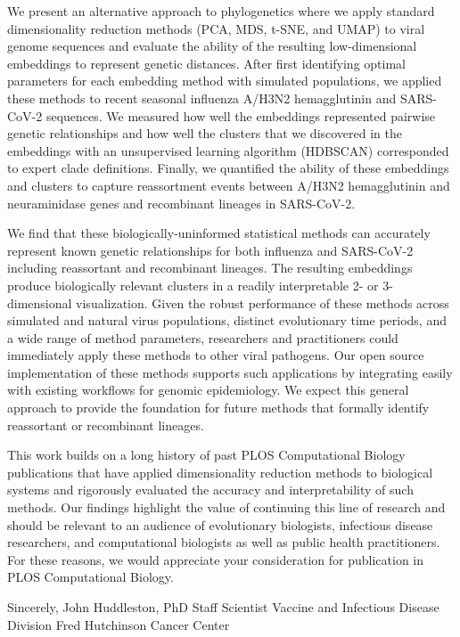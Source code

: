 \documentclass[11pt]{article}
\begin{document}
We present an alternative approach to phylogenetics where we apply standard dimensionality reduction methods (PCA, MDS, t-SNE, and UMAP) to viral genome sequences and evaluate the ability of the resulting low-dimensional embeddings to represent genetic distances.
After first identifying optimal parameters for each embedding method with simulated populations, we applied these methods to recent seasonal influenza A/H3N2 hemagglutinin and SARS-CoV-2 sequences.
We measured how well the embeddings represented pairwise genetic relationships and how well the clusters that we discovered in the embeddings with an unsupervised learning algorithm (HDBSCAN) corresponded to expert clade definitions.
Finally, we quantified the ability of these embeddings and clusters to capture reassortment events between A/H3N2 hemagglutinin and neuraminidase genes and recombinant lineages in SARS-CoV-2.

We find that these biologically-uninformed statistical methods can accurately represent known genetic relationships for both influenza and SARS-CoV-2 including reassortant and recombinant lineages.
The resulting embeddings produce biologically relevant clusters in a readily interpretable 2- or 3-dimensional visualization.
Given the robust performance of these methods across simulated and natural virus populations, distinct evolutionary time periods, and a wide range of method parameters, researchers and practitioners could immediately apply these methods to other viral pathogens.
Our open source implementation of these methods supports such applications by integrating easily with existing workflows for genomic epidemiology.
We expect this general approach to provide the foundation for future methods that formally identify reassortant or recombinant lineages.

This work builds on a long history of past PLOS Computational Biology publications that have applied dimensionality reduction methods to biological systems and rigorously evaluated the accuracy and interpretability of such methods.
Our findings highlight the value of continuing this line of research and should be relevant to an audience of evolutionary biologists, infectious disease researchers, and computational biologists as well as public health practitioners.
For these reasons, we would appreciate your consideration for publication in PLOS Computational Biology.

\vspace{0.3in} %

Sincerely, \newline
\vspace{0.05in} \newline
John Huddleston, PhD \newline
Staff Scientist \newline
Vaccine and Infectious Disease Division \newline
Fred Hutchinson Cancer Center
\end{document}

